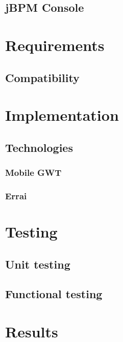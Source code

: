 \documentclass[12pt,oneside,draft]{fithesis2}
\begin{document}
\section{jBPM Console}

\chapter{Requirements}
\section{Compatibility}

\chapter{Implementation}
\section{Technologies}
\subsection{Mobile GWT}
\subsection{Errai}

\chapter{Testing}
\section{Unit testing}
\section{Functional testing}

\chapter{Results}

\end{document}
